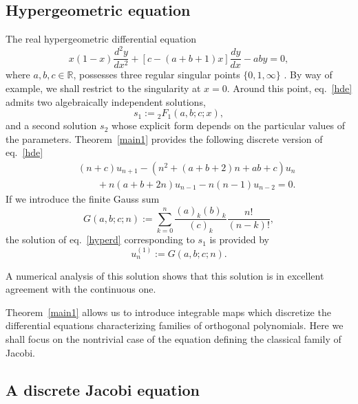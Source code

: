 \documentclass[10pt]{amsart}
\numberwithin{equation}{section}
\theoremstyle{definition}
\begin{document}
\subsection{Hypergeometric equation}
\label{sec10.3}

The real hypergeometric differential equation
\begin{equation}
x(1-x)\frac{d^{2} y}{dx^{2}}+\left [c-(a+b+1)x\right ]\frac{dy}{dx}-ab
y=0,
\label{hde}
\end{equation}
where $a,b,c\in \mathbb{R}$, possesses three regular singular points
$\{0,1, \infty \}$ \cite{AS}. By way of example, we shall restrict to the
singularity at $x=0$. Around this point,  eq.~\eqref{hde} admits two algebraically
independent solutions,
\begin{equation}
s_{1}:={}_{2} F_{1}(a,b;c;x),
\label{eq10.16}
\end{equation}
and a second solution $s_{2}$ whose explicit form depends on the particular
values of the parameters.  Theorem~\ref{main1} provides the following discrete
version of  eq.~\eqref{hde}
\begin{eqnarray}
&&(n+c) u_{n+1}-(n^{2}+(a+b+2)n+ab+c)u_{n}
\label{eq10.17}
\\
&&\qquad +n( a+b+2n )u_{n-1} -n(n-1) u_{n-2}
\nonumber
=0.
\nonumber
\label{hyperd}
\end{eqnarray}
If we introduce the finite Gauss sum
\begin{equation}
G(a,b;c;n):=\sum _{k=0}^{n}\frac{(a)_{k} (b)_{k}}{(c)_{k}}
\frac{n!}{(n-k)!},
\label{eq10.18}
\end{equation}
the solution of  eq.~\eqref{hyperd} corresponding to $s_{1}$ is provided
by
\begin{equation}
u^{(1)}_{n}:=G(a,b;c;n).
\label{eq10.19}
\end{equation}

A numerical analysis of this solution shows that this solution is in excellent
agreement with the continuous one.

Theorem~\ref{main1} allows us to introduce integrable maps which discretize
the differential equations characterizing families of orthogonal polynomials.
Here we shall focus on the nontrivial case of the equation defining the
classical family of Jacobi.

\subsection{A discrete Jacobi equation}
\label{sec10.4}
\end{document}
